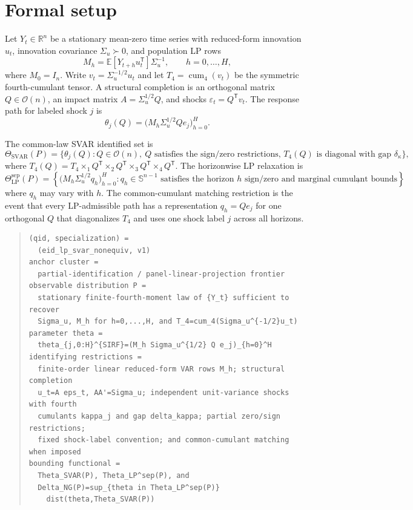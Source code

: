 \documentclass[11pt]{article}
\newcommand{\E}{\mathbb{E}}
\newcommand{\transpose}{\mathsf{T}}
\newcommand{\R}{\mathbb{R}}
\theoremstyle{definition}
\theoremstyle{plain}
\theoremstyle{remark}
\begin{document}
\section{Formal setup}
Let \(Y_t\in\R^n\) be a stationary mean-zero time series with reduced-form innovation \(u_t\), innovation covariance \(\Sigma_u\succ0\), and population LP rows
\[
M_h=\E[Y_{t+h}u_t^\transpose]\Sigma_u^{-1},\qquad h=0,\ldots,H,
\]
where \(M_0=I_n\).  Write \(v_t=\Sigma_u^{-1/2}u_t\) and let \(T_4=\operatorname{cum}_4(v_t)\) be the symmetric fourth-cumulant tensor.  A structural completion is an orthogonal matrix \(Q\in\mathcal O(n)\), an impact matrix \(A=\Sigma_u^{1/2}Q\), and shocks \(\varepsilon_t=Q^\transpose v_t\).  The response path for labeled shock \(j\) is
\[
\theta_j(Q)=\bigl(M_h\Sigma_u^{1/2}Qe_j\bigr)_{h=0}^H.
\]

The common-law SVAR identified set is
\[
\Theta_{\mathrm{SVAR}}(P)
=
\{\theta_j(Q): Q\in\mathcal O(n),\ Q\text{ satisfies the sign/zero restrictions, }
T_4(Q)\text{ is diagonal with gap }\delta_\kappa\},
\]
where \(T_4(Q)=T_4\times_1 Q^\transpose\times_2 Q^\transpose\times_3 Q^\transpose\times_4 Q^\transpose\).  The horizonwise LP relaxation is
\[
\Theta_{\mathrm{LP}}^{\mathrm{sep}}(P)
=
\left\{\bigl(M_h\Sigma_u^{1/2}q_h\bigr)_{h=0}^H:
q_h\in\mathbb S^{n-1}\text{ satisfies the horizon }h\text{ sign/zero and marginal cumulant bounds}\right\},
\]
where \(q_h\) may vary with \(h\).  The common-cumulant matching restriction is the event that every LP-admissible path has a representation \(q_h=Qe_j\) for one orthogonal \(Q\) that diagonalizes \(T_4\) and uses one shock label \(j\) across all horizons.

\begin{quote}\small
\begin{verbatim}
(qid, specialization) =
  (eid_lp_svar_nonequiv, v1)
anchor cluster =
  partial-identification / panel-linear-projection frontier
observable distribution P =
  stationary finite-fourth-moment law of {Y_t} sufficient to recover
  Sigma_u, M_h for h=0,...,H, and T_4=cum_4(Sigma_u^{-1/2}u_t)
parameter theta =
  theta_{j,0:H}^{SIRF}=(M_h Sigma_u^{1/2} Q e_j)_{h=0}^H
identifying restrictions =
  finite-order linear reduced-form VAR rows M_h; structural completion
  u_t=A eps_t, AA'=Sigma_u; independent unit-variance shocks with fourth
  cumulants kappa_j and gap delta_kappa; partial zero/sign restrictions;
  fixed shock-label convention; and common-cumulant matching when imposed
bounding functional =
  Theta_SVAR(P), Theta_LP^sep(P), and
  Delta_NG(P)=sup_{theta in Theta_LP^sep(P)}
    dist(theta,Theta_SVAR(P))
\end{verbatim}
\end{quote}
\end{document}
